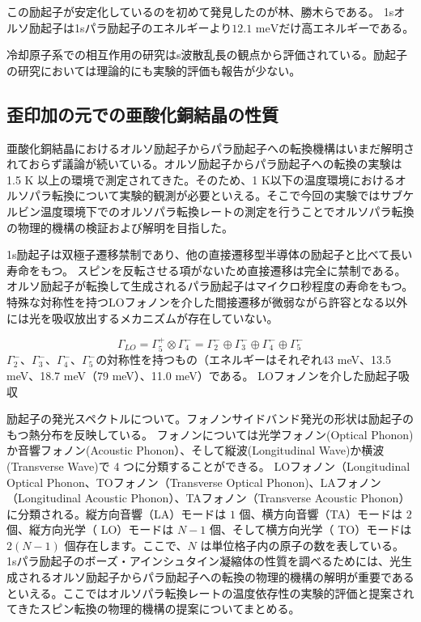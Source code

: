 この励起子が安定化しているのを初めて発見したのが林、勝木らである。
1sオルソ励起子は1sパラ励起子のエネルギーより$ 12.1\text{ meV}$だけ高エネルギーである。


冷却原子系での相互作用の研究はs波散乱長の観点から評価されている。励起子の研究においては理論的にも実験的評価も報告が少ない。

\subsection{歪印加の元での亜酸化銅結晶の性質}
亜酸化銅結晶におけるオルソ励起子からパラ励起子への転換機構はいまだ解明されておらず議論が続いている。オルソ励起子からパラ励起子への転換の実験は 1.5 K 以上の環境で測定されてきた。そのため、1 K以下の温度環境におけるオルソパラ転換について実験的観測が必要といえる。そこで今回の実験ではサブケルビン温度環境下でのオルソパラ転換レートの測定を行うことでオルソパラ転換の物理的機構の検証および解明を目指した。

1s励起子は双極子遷移禁制であり、他の直接遷移型半導体の励起子と比べて長い寿命をもつ。
スピンを反転させる項がないため直接遷移は完全に禁制である。オルソ励起子が転換して生成されるパラ励起子はマイクロ秒程度の寿命をもつ。特殊な対称性を持つLOフォノンを介した間接遷移が微弱ながら許容となる以外には光を吸収放出するメカニズムが存在していない。

\begin{equation}
    \Gamma_{LO} = \Gamma_5^+ \otimes \Gamma_4^- = \Gamma_2^- \oplus \Gamma_3^- \oplus \Gamma_4^- \oplus \Gamma_5^- 
\end{equation}
$\Gamma_2^-$、$\Gamma_3^-$、$\Gamma_4^-$、$\Gamma_5^-$の対称性を持つもの（エネルギーはそれぞれ43 meV、13.5 meV、18.7 meV（79 meV）、11.0 meV）である。
LOフォノンを介した励起子吸収

励起子の発光スペクトルについて。フォノンサイドバンド発光の形状は励起子のもつ熱分布を反映している。
フォノンについては光学フォノン(Optical Phonon)か音響フォノン(Acoustic Phonon）、そして縦波(Longitudinal Wave)か横波(Transverse Wave)で 4 つに分類することができる。
LOフォノン（Longitudinal Optical Phonon、TOフォノン（Transverse Optical Phonon)、LAフォノン（Longitudinal Acoustic Phonon）、TAフォノン（Transverse Acoustic Phonon）に分類される。縦方向音響（LA）モードは $1$ 個、横方向音響（TA）モードは $2$ 個、縦方向光学（ LO）モードは $N - 1$ 個、そして横方向光学（ TO）モードは $2(N - 1)$ 個存在します。ここで、$N$ は単位格子内の原子の数を表している。\\
1sパラ励起子のボーズ・アインシュタイン凝縮体の性質を調べるためには、光生成されるオルソ励起子からパラ励起子への転換の物理的機構の解明が重要であるといえる。ここではオルソパラ転換レートの温度依存性の実験的評価と提案されてきたスピン転換の物理的機構の提案についてまとめる。

